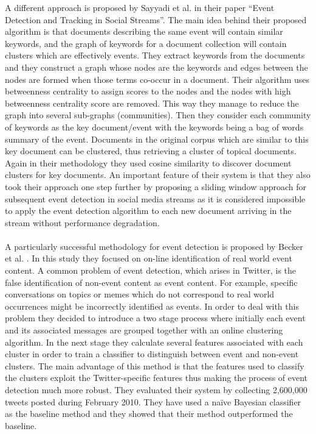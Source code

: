 A different approach is proposed by Sayyadi et al. \citep{conf/icwsm/SayyadiHM09} in their paper ``Event Detection and Tracking in Social Streams''. The main idea behind their proposed algorithm is that documents describing the same event will contain similar keywords, and the graph of keywords for a document collection will contain clusters which are effectively events. They extract keywords from the documents and they construct a graph whose nodes are the keywords and edges between the nodes are formed when those terms co-occur in a document. Their algorithm uses betweenness centrality to assign scores to the nodes and the nodes with high betweenness centrality score are removed. This way they manage to reduce the graph into several sub-graphs (communities). Then they consider each community of keywords as the key document/event with the keywords being a bag of words summary of the event. Documents in the original corpus which are similar to this key document can be clustered, thus retrieving a cluster of topical documents. Again in their methodology they used cosine similarity to discover document clusters for key documents. An important feature of their system is that they also took their approach one step further by proposing a sliding window approach for subsequent event detection in social media streams as it is considered impossible to apply the event detection algorithm to each new document arriving in the stream without performance degradation.\\\\
A particularly successful methodology for event detection is proposed by Becker et al. \citep{Becker_Gravano_2011}. In this study they focused on on-line identification of real world event content. A common problem of event detection, which arises in Twitter, is the false identification of non-event content as event content. For example, specific conversations on topics or memes which do not correspond to real world occurrences might be incorrectly identified as events. In order to deal with this problem they decided to introduce a two stage process where initially each event and its associated messages are grouped together with an online clustering algorithm. In the next stage they calculate several features associated with each cluster in order to train a classifier to distinguish between event and non-event clusters. The main advantage of this method is that the features used to classify the clusters exploit the Twitter-specific features thus making the process of event detection much more robust. They evaluated their system by collecting 2,600,000 tweets posted during February 2010. They have used a naïve Bayesian classifier as the baseline method and they showed that their method outperformed the baseline.
	 
